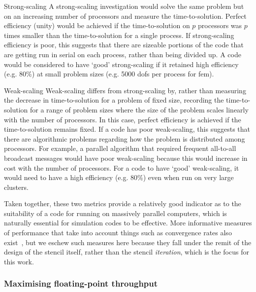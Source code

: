 \begin{paragraph}{Strong-scaling}
A strong-scaling investigation would solve the same problem but on an increasing number of processors and measure the time-to-solution.
Perfect efficiency (unity) would be achieved if the time-to-solution on $p$ processors was $p$ times smaller than the time-to-solution for a single process.
If strong-scaling efficiency is poor, this suggests that there are sizeable portions of the code that are getting run in serial on each process, rather than being divided up.
A code would be considered to have `good' strong-scaling if it retained high efficiency (e.g. 80\%) at small problem sizes (e.g. 5000 \glspl{dof} per process for \gls{fem}).
\end{paragraph}

\begin{paragraph}{Weak-scaling}
Weak-scaling differs from strong-scaling by, rather than measuring the decrease in time-to-solution for a problem of fixed size, recording the time-to-solution for a range of problem sizes where the size of the problem scales linearly with the number of processors.
In this case, perfect efficiency is achieved if the time-to-solution remains fixed.
If a code has poor weak-scaling, this suggests that there are algorithmic problems regarding how the problem is distributed among processors.
For example, a parallel algorithm that required frequent all-to-all broadcast messages would have poor weak-scaling because this would increase in cost with the number of processors.
For a code to have `good' weak-scaling, it would need to have a high efficiency (e.g. 80\%) even when run on very large clusters.
\end{paragraph}

Taken together, these two metrics provide a relatively good indicator as to the suitability of a code for running on massively parallel computers, which is naturally essential for simulation codes to be effective.
More informative measures of performance that take into account things such as convergence rates also exist~\cite{changComparativeStudyFinite2018}, but we eschew such measures here because they fall under the remit of the design of the stencil itself, rather than the stencil \textit{iteration}, which is the focus for this work.

\subsubsection{Maximising floating-point throughput}
\label{sec:background_perf_flops}

